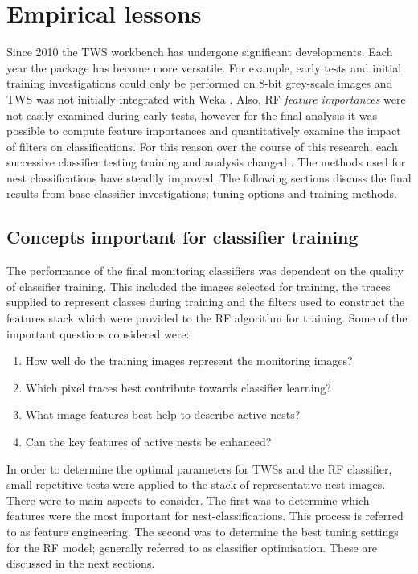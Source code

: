 \clearpage

\section{Empirical lessons}
Since 2010 the \ac{TWS} workbench has undergone significant developments.  Each year the package has become more versatile. For example, early tests and initial training investigations could only be performed on 8-bit grey-scale images and \acs{TWS} was not initially integrated with Weka \cite{Hall2009}. Also, \acs{RF} \emph{feature importances} were not easily examined during early tests, however for the final analysis it was possible to compute feature importances and quantitatively examine the impact of filters on classifications. For this reason over the course of this research, each successive classifier testing training and analysis changed \cite{Hart2007}. The methods used for nest classifications have steadily improved. The following sections discuss the final results from base-classifier investigations; tuning options and training methods.

\subsection{Concepts important for classifier training}
The performance of the final monitoring classifiers was dependent on the quality of classifier training. This included the images selected for training, the traces supplied to represent classes during training and the filters used to construct the features stack which were provided to the \ac{RF} algorithm for training. Some of the important questions considered were:

\begin{enumerate}
\item How well do the training images represent the monitoring  images? 
\item Which pixel traces best contribute towards classifier learning? 
\item What image features best help to describe active nests?
\item Can the key features of active nests be enhanced?
\end{enumerate}

In order to determine the optimal parameters for \acp{TWS} and the \ac{RF} classifier, small repetitive tests were applied to the stack of representative nest images. There were to main aspects to consider. The first was to determine which features were the most important for nest-classifications. This process is referred to as feature engineering. The second was to determine the best tuning settings for the \ac{RF} model; generally referred to as classifier optimisation. These are discussed in the next sections.

